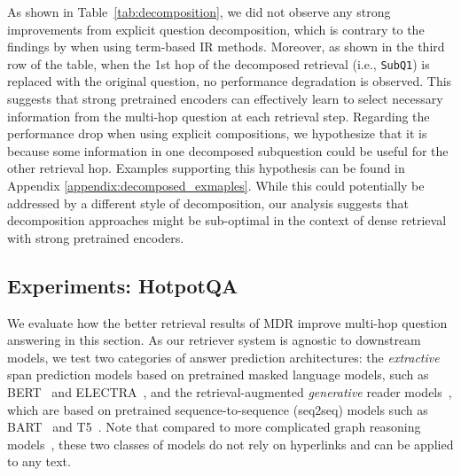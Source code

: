 \documentclass{article} \usepackage{iclr2021_conference,times}
\newcommand{\method}{MDR\xspace}
\begin{document}
As shown in Table~\ref{tab:decomposition}, we did not observe any strong improvements from explicit question decomposition, which is contrary to the findings by \citet{Break} when using term-based IR methods. Moreover, as shown in the third row of the table, when the 1st hop of the decomposed retrieval (i.e., \texttt{SubQ1}) is replaced with the original question, no performance degradation is observed. This suggests that strong pretrained encoders can effectively learn to select necessary information from the multi-hop question at each retrieval step. Regarding the performance drop when using explicit compositions, we hypothesize that it is because some information in one decomposed subquestion could be useful for the other retrieval hop. Examples supporting this hypothesis can be found in Appendix \ref{appendix:decomposed_exmaples}. While this could potentially be addressed by a different style of decomposition, our analysis suggests that decomposition approaches might be sub-optimal in the context of dense retrieval with strong pretrained encoders.




\subsection{Experiments: HotpotQA}
\label{sec:exp-hotpotqa}





We evaluate how the better retrieval results of \method improve multi-hop question answering in this section. As our retriever system is agnostic to downstream models, we test two categories of answer prediction architectures: 
the \emph{extractive} span prediction models based on pretrained masked language models, such as BERT~\citep{BERT} and ELECTRA~\citep{ELECTRA},
and the retrieval-augmented \emph{generative} reader models~\citep{RAG,FiD}, which are based on pretrained sequence-to-sequence (seq2seq) models such as BART~\citep{BART} and T5~\citep{t5}. 
Note that compared to more complicated graph reasoning models~\citep{HGN,Transformer-XH}, these two classes of models do not rely on hyperlinks and can be applied to any text.
\end{document}
